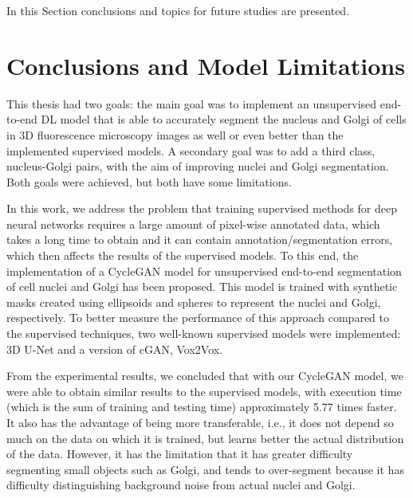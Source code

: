 \label{chap:conclusion}

In this Section conclusions and topics for future studies are presented.
\section{Conclusions and Model Limitations}

This thesis had two goals: the main goal was to implement an unsupervised end-to-end \ac{DL} model that is able to accurately segment the nucleus and Golgi of cells in \ac{3D} fluorescence microscopy images as well or even better than the implemented supervised models. A secondary goal was to add a third class, nucleus-Golgi pairs, with the aim of improving nuclei and Golgi segmentation. Both goals were achieved, but both have some limitations.

In this work, we address the problem that training supervised methods for deep neural networks requires a large amount of pixel-wise annotated data, which takes a long time to obtain and it can contain annotation/segmentation errors, which then affects the results of the supervised models. To this end, the implementation of a CycleGAN model for unsupervised end-to-end segmentation of cell nuclei and Golgi has been proposed. This model is trained with synthetic masks created using ellipsoids and spheres to represent the nuclei and Golgi, respectively. To better measure the performance of this approach compared to the supervised techniques, two well-known supervised models were implemented: \ac{3D} U-Net and a version of \ac{cGAN}, Vox2Vox. 

From the experimental results, we concluded that with our CycleGAN model, we were able to obtain similar results to the supervised models, with execution time (which is the sum of training and testing time) approximately 5.77 times faster. It also has the advantage of being more transferable, i.e., it does not depend so much on the data on which it is trained, but learns better the actual distribution of the data. However, it has the limitation that it has greater difficulty segmenting small objects such as Golgi, and tends to over-segment because it has difficulty distinguishing background noise from actual nuclei and Golgi.


